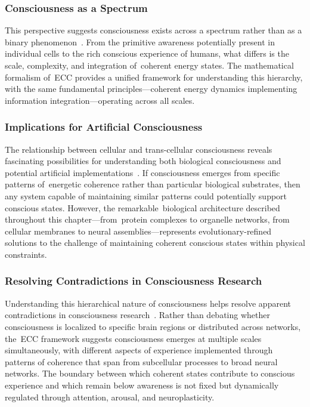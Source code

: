 \subsubsection{Consciousness as a Spectrum~~}

This perspective suggests consciousness exists across a spectrum rather than as a binary phenomenon~\cite{feinberg2016ancient, barrett2017emotions}. From the primitive awareness potentially present in individual cells to the rich conscious experience of humans, what differs is the scale, complexity, and integration of~coherent energy states. The mathematical formalism of~ECC provides a unified framework for understanding this hierarchy, with the same fundamental principles—coherent energy dynamics implementing information integration—operating across all scales.

\subsubsection{Implications for Artificial Consciousness~~}

The relationship between cellular and trans-cellular consciousness reveals fascinating possibilities for understanding both biological consciousness and potential artificial implementations~\cite{butlin2023consciousnessartificialintelligenceinsights, Dehaene2017}. If consciousness emerges from specific patterns of~energetic coherence rather than particular biological substrates, then any system capable of maintaining similar patterns could potentially support conscious states. However, the remarkable~biological architecture described throughout this chapter—from~protein complexes to organelle networks, from cellular membranes to neural assemblies—represents evolutionary-refined solutions to the challenge of maintaining coherent conscious states within physical constraints.

\subsubsection{Resolving Contradictions in Consciousness Research~~}

Understanding this hierarchical nature of consciousness helps resolve apparent contradictions in consciousness research~\cite{Tononi2016, seth2024conscious}. Rather than debating whether consciousness is localized to specific brain regions or distributed across networks, the~ECC framework suggests consciousness emerges at multiple scales simultaneously, with different aspects of experience implemented through patterns of coherence that span from subcellular processes to broad neural networks. The boundary between which coherent states contribute to conscious experience and which remain below awareness is not fixed but dynamically regulated through attention, arousal, and neuroplasticity.

